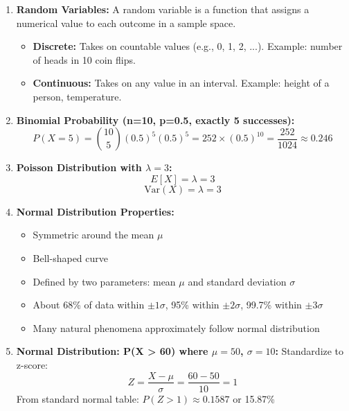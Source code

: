 \begin{enumerate}
    \item \textbf{Random Variables:}
    A random variable is a function that assigns a numerical value to each outcome in a sample space.
    \begin{itemize}
        \item \textbf{Discrete:} Takes on countable values (e.g., 0, 1, 2, ...). Example: number of heads in 10 coin flips.
        \item \textbf{Continuous:} Takes on any value in an interval. Example: height of a person, temperature.
    \end{itemize}
    
    \item \textbf{Binomial Probability (n=10, p=0.5, exactly 5 successes):}
    \begin{equation}
        P(X = 5) = \binom{10}{5} (0.5)^5 (0.5)^5 = 252 \times (0.5)^{10} = \frac{252}{1024} \approx 0.246
    \end{equation}
    
    \item \textbf{Poisson Distribution with $\lambda = 3$:}
    \begin{equation}
        E[X] = \lambda = 3
    \end{equation}
    \begin{equation}
        \text{Var}(X) = \lambda = 3
    \end{equation}
    
    \item \textbf{Normal Distribution Properties:}
    \begin{itemize}
        \item Symmetric around the mean $\mu$
        \item Bell-shaped curve
        \item Defined by two parameters: mean $\mu$ and standard deviation $\sigma$
        \item About 68\% of data within $\pm 1\sigma$, 95\% within $\pm 2\sigma$, 99.7\% within $\pm 3\sigma$
        \item Many natural phenomena approximately follow normal distribution
    \end{itemize}
    
    \item \textbf{Normal Distribution: P(X > 60) where $\mu=50$, $\sigma=10$:}
    Standardize to z-score:
    \begin{equation}
        Z = \frac{X - \mu}{\sigma} = \frac{60 - 50}{10} = 1
    \end{equation}
    From standard normal table: $P(Z > 1) \approx 0.1587$ or 15.87\%
\end{enumerate}

